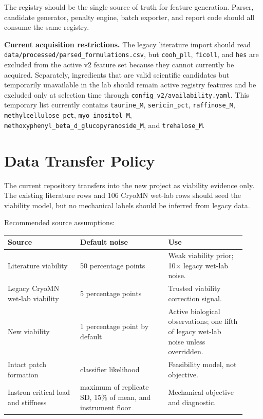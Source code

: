 \documentclass[11pt]{article}
\newcommand{\code}[1]{\texttt{#1}}
\newcommand{\metric}[1]{\texttt{#1}}
\begin{document}
The registry should be the single source of truth for feature generation. Parser,
candidate generator, penalty engine, batch exporter, and report code should all consume
the same registry.

\textbf{Current acquisition restrictions.} The legacy literature import should read
\code{data/processed/parsed\_formulations.csv}, but \metric{cooh\_pll},
\metric{ficoll}, and \metric{hes} are excluded from the active v2 feature set because
they cannot currently be acquired. Separately, ingredients that are valid scientific
candidates but temporarily unavailable in the lab should remain active registry
features and be excluded only at selection time through
\code{config\_v2/availability.yaml}. This temporary list currently contains
\metric{taurine\_M}, \metric{sericin\_pct}, \metric{raffinose\_M},
\metric{methylcellulose\_pct}, \metric{myo\_inositol\_M},
\metric{methoxyphenyl\_beta\_d\_glucopyranoside\_M}, and
\metric{trehalose\_M}.

\section{Data Transfer Policy}

The current repository transfers into the new project as viability evidence only. The
existing literature rows and 106 CryoMN wet-lab rows should seed the viability model,
but no mechanical labels should be inferred from legacy data.

Recommended source assumptions:
\begin{longtable}{@{}p{0.28\linewidth}p{0.34\linewidth}p{0.30\linewidth}@{}}
\toprule
\textbf{Source} & \textbf{Default noise} & \textbf{Use} \\
\midrule
Literature viability & 50 percentage points & Weak viability prior; 10$\times$ legacy wet-lab noise. \\
Legacy CryoMN wet-lab viability & 5 percentage points & Trusted viability correction signal. \\
New viability & 1 percentage point by default & Active biological observations; one fifth of legacy wet-lab noise unless overridden. \\
Intact patch formation & classifier likelihood & Feasibility model, not objective. \\
Instron critical load and stiffness & maximum of replicate SD, 15\% of mean, and instrument floor & Mechanical objective and diagnostic. \\
\bottomrule
\end{longtable}
\end{document}
